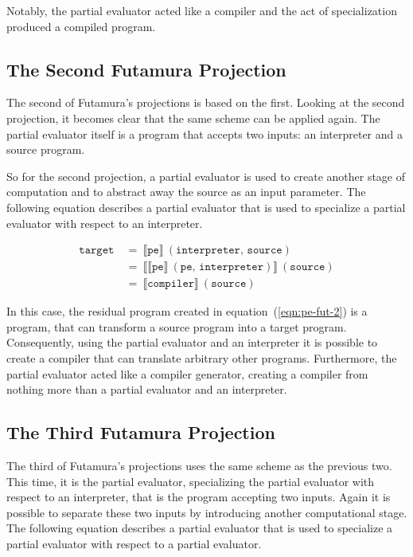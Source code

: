 Notably, the partial evaluator acted like a compiler and the act of specialization produced a compiled program.


\subsection{The Second Futamura Projection}\label{sec:futamura-second}

The second of Futamura's projections is based on the first.
Looking at the second projection, it becomes clear that the same scheme can be applied again.
The partial evaluator itself is a program that accepts two inputs: an interpreter and a source program.

So for the second projection, a partial evaluator is used to create another stage of computation and to abstract away the source as an input parameter.
The following equation describes a partial evaluator that is used to specialize a partial evaluator with respect to an interpreter.

\begin{align}
  \mathtt{target}\
  &=\ \llbracket \mathtt{pe} \rrbracket \ (\mathtt{interpreter},\, \mathtt{source}) \\
  &=\ \llbracket \llbracket \mathtt{pe} \rrbracket \ (\mathtt{pe},\, \mathtt{interpreter}) \rrbracket \ (\mathtt{source}) \label{eqn:pe-fut-2}\\
  &=\ \llbracket \mathtt{compiler} \rrbracket \ (\mathtt{source})
\end{align}

In this case, the residual program created in equation~(\ref{eqn:pe-fut-2}) is a program, that can transform a source program into a target program.
Consequently, using the partial evaluator and an interpreter it is possible to create a compiler that can translate arbitrary other programs.
Furthermore, the partial evaluator acted like a compiler generator, creating a compiler from nothing more than a partial evaluator and an interpreter.


\subsection{The Third Futamura Projection}\label{sec:futamura-thrid}

The third of Futamura's projections uses the same scheme as the previous two.
This time, it is the partial evaluator, specializing the partial evaluator with respect to an interpreter, that is the program accepting two inputs.
Again it is possible to separate these two inputs by introducing another computational stage.
The following equation describes a partial evaluator that is used to specialize a partial evaluator with respect to a partial evaluator.

